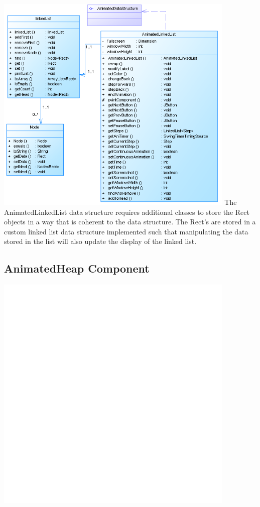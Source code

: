 \documentclass{l3proj}
\begin{document}
\includegraphics[width=115mm]{images/linkedListDiagram.png}
The AnimatedLinkedList data structure requires additional classes to store the Rect objects in a way that is coherent to the data structure.
The Rect's are stored in a custom linked list data structure implemented such that manipulating the data stored in the list will also update the display of
the linked list.
\subsection{AnimatedHeap Component}
\includegraphics[width=115mm]{images/heapDiagram.png}
\end{document}
